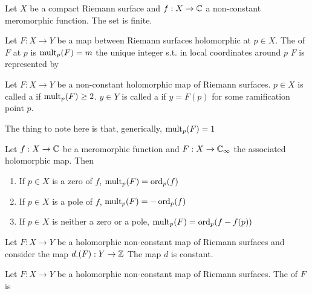 \documentclass{article}
\begin{document}
\begin{corollary}
Let $X$ be a  compact Riemann surface and $f:X \to \mathbb{C}$ a non-constant meromorphic function. The set
is finite.
\end{corollary}

\begin{definition}
	Let $F:X \to Y$ be a map between Riemann surfaces holomorphic at $p \in X$. The  of $F$ at $p$ is $\operatorname{mult}_p(F)=m$ the unique integer s.t. in local coordinates around $p$ $F$ is represented by 
\end{definition}

\begin{definition}
Let $F:X \to Y$ be a non-constant holomorphic map of Riemann surfaces. $p \in X$ is called a  if $\operatorname{mult}_p(F) \geq 2$. $y\in Y$ is called a  if $y=F(p)$ for some ramification point $p$. 
\end{definition}

\begin{remark}
	The thing to note here is that, generically, $\operatorname{mult}_p(F) = 1$ 
\end{remark}

\begin{prop}
	Let $f:X \to \mathbb{C}$ be a meromorphic function and $F:X \to \mathbb{C}_\infty$ the associated holomorphic map. Then 
	\begin{enumerate}
		\item If $p \in X$ is a zero of $f$, $\operatorname{mult}_p(F) = \operatorname{ord}_p(f)$
		\item If $p \in X$ is a pole of $f$, $\operatorname{mult}_p(F) = -\operatorname{ord}_p(f)$
		\item If $p \in X$ is neither a zero or a pole, $\operatorname{mult}_p(F) = \operatorname{ord}_p(f-f(p))$
	\end{enumerate}
\end{prop}

\begin{prop}
	Let $F:X \to Y$ be a holomorphic non-constant map of Riemann surfaces and consider the map $d_{\cdot}(F):Y \to \mathbb{Z}$ 
The map $d$ is constant. 
\end{prop}

\begin{definition}
Let $F:X \to Y$ be a holomorphic non-constant map of Riemann surfaces. The  of $F$ is 
\end{definition}
\end{document}
